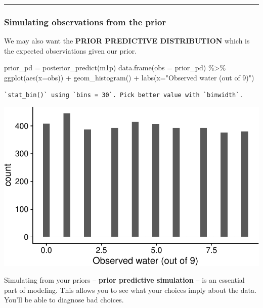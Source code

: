 \documentclass[
  letterpaper,
  DIV=11,
  numbers=noendperiod]{scrartcl}
\newenvironment{Shaded}{\begin{snugshade}}{\end{snugshade}}
\newcommand{\AttributeTok}[1]{\textcolor[rgb]{0.40,0.45,0.13}{#1}}
\newcommand{\FunctionTok}[1]{\textcolor[rgb]{0.28,0.35,0.67}{#1}}
\newcommand{\NormalTok}[1]{\textcolor[rgb]{0.00,0.23,0.31}{#1}}
\newcommand{\OtherTok}[1]{\textcolor[rgb]{0.00,0.23,0.31}{#1}}
\newcommand{\SpecialCharTok}[1]{\textcolor[rgb]{0.37,0.37,0.37}{#1}}
\newcommand{\StringTok}[1]{\textcolor[rgb]{0.13,0.47,0.30}{#1}}
\begin{document}
\begin{center}\rule{0.5\linewidth}{0.5pt}\end{center}

\subsubsection{Simulating observations from the
prior}\label{simulating-observations-from-the-prior}

We may also want the \textbf{PRIOR PREDICTIVE DISTRIBUTION} which is the
expected observiations given our prior.

\begin{Shaded}
\begin{Highlighting}[]
\NormalTok{prior\_pd }\OtherTok{=} \FunctionTok{posterior\_predict}\NormalTok{(m1p)}
\FunctionTok{data.frame}\NormalTok{(}\AttributeTok{obs =}\NormalTok{ prior\_pd) }\SpecialCharTok{\%\textgreater{}\%} 
  \FunctionTok{ggplot}\NormalTok{(}\FunctionTok{aes}\NormalTok{(}\AttributeTok{x=}\NormalTok{obs)) }\SpecialCharTok{+}
  \FunctionTok{geom\_histogram}\NormalTok{() }\SpecialCharTok{+}
  \FunctionTok{labs}\NormalTok{(}\AttributeTok{x=}\StringTok{"Observed water (out of 9)"}\NormalTok{)}
\end{Highlighting}
\end{Shaded}

\begin{verbatim}
`stat_bin()` using `bins = 30`. Pick better value with `binwidth`.
\end{verbatim}

\includegraphics[width=17.1875in,height=\textheight]{lecture02-1_files/figure-pdf/unnamed-chunk-11-1.pdf}

Simulating from your priors -- \textbf{prior predictive simulation} --
is an essential part of modeling. This allows you to see what your
choices imply about the data. You'll be able to diagnose bad choices.
\end{document}
